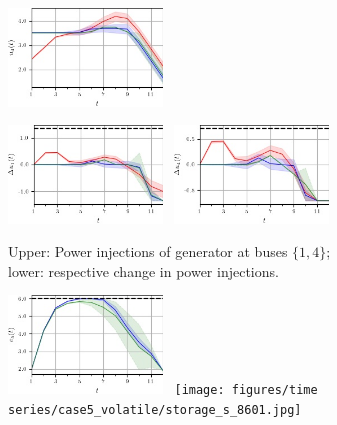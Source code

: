 \documentclass[final,3p,times,twocolumn]{elsarticle}  %
\begin{document}
\begin{figure}
\begin{subfigure}[c]{\figwidth}
        \includegraphics[width=0.45\textwidth]{figures/time series/case5_volatile/gen_u_8102.jpg}%
		
        \includegraphics[width=0.45\textwidth]{figures/time series/case5_volatile/gen_delta_u_4151.jpg}~
        \includegraphics[width=0.45\textwidth]{figures/time series/case5_volatile/gen_delta_u_4152.jpg}%
		\vspace{-2mm}		
		\caption{Upper: Power injections of generator at buses $\{1, 4\}$; lower: respective change in power injections.}
		\label{fig:case5:Generation_volatile}
	\end{subfigure}
	
	\begin{subfigure}[c]{\figwidth}
		\centering
        \includegraphics[width=0.45\textwidth]{figures/time series/case5_volatile/storage_e_4651.jpg}~
        \texttt{[image: figures/time series/case5\_volatile/storage\_s\_8601.jpg]}
		

\end{subfigure}
\end{figure}
\end{document}
